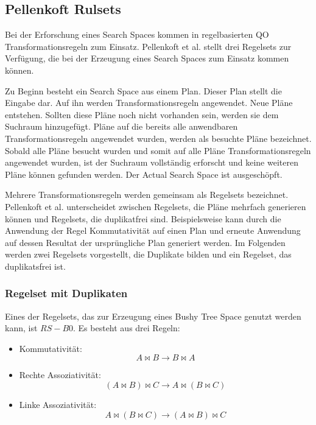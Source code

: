 \subsection{Pellenkoft Rulsets}

Bei der Erforschung eines Search Spaces kommen in regelbasierten \ac{QO} Transformationsregeln zum Einsatz. Pellenkoft et al. \cite{pellenkoft1997duplicate} \cite{manegold2000multi} \cite{pellenkoft1997complexity} stellt drei Regelsets zur Verfügung, die bei der Erzeugung eines Search Spaces zum Einsatz kommen können.



Zu Beginn besteht ein Search Space aus einem Plan. Dieser Plan stellt die Eingabe dar. Auf ihn werden Transformationsregeln angewendet. Neue Pläne entstehen. Sollten diese Pläne noch nicht vorhanden sein, werden sie dem Suchraum hinzugefügt. Pläne auf die bereits alle anwendbaren Transformationsregeln angewendet wurden, werden als besuchte Pläne bezeichnet. Sobald alle Pläne besucht wurden und somit auf alle Pläne Transformationsregeln angewendet wurden, ist der Suchraum vollständig erforscht und keine weiteren Pläne können gefunden werden. Der Actual Search Space ist ausgeschöpft.

Mehrere Transformationsregeln werden gemeinsam als Regelsets bezeichnet. Pellenkoft et al. unterscheidet zwischen Regelsets, die Pläne mehrfach generieren können und Regelsets, die duplikatfrei sind. Beispielsweise kann durch die Anwendung der Regel Kommutativität auf einen Plan und erneute Anwendung auf dessen Resultat  der ursprüngliche Plan generiert werden. Im Folgenden werden zwei Regelsets vorgestellt, die Duplikate bilden und ein Regelset, das duplikatsfrei ist.


\subsubsection{Regelset mit Duplikaten}

Eines der Regelsets, das zur Erzeugung eines Bushy Tree Space genutzt werden kann, ist $RS-B0$. Es besteht aus drei Regeln:

\begin{itemize}
\item Kommutativität: $$ A \Join B \to B \Join A$$
\item Rechte Assoziativität: $$(A \Join B) \Join C \to A \Join (B \Join C) $$
\item Linke Assoziativität: $$A \Join (B \Join C) \to (A \Join B) \Join C$$
\end{itemize}

